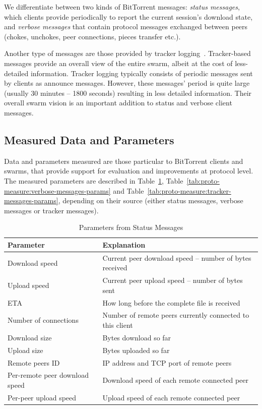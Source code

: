 We differentiate between two kinds of BitTorrent messages: \textit{status
messages}, which clients provide periodically to report the current session’s
download state, and \textit{verbose messages} that contain protocol messages
exchanged between peers (chokes, unchokes, peer connections, pieces transfer
etc.).

Another type of messages are those provided by tracker
logging~\cite{tracker-mon}. Tracker-based
messages provide an overall view of the entire swarm, albeit at the cost of
less-detailed information. Tracker logging typically consists of periodic
messages sent by clients as announce messages. However, these messages' period
is quite large (usually 30 minutes -- 1800 seconds) resulting in less detailed
information. Their overall swarm vision is an important addition to status and
verbose client messages.

\subsection{Measured Data and Parameters}

Data and parameters measured are those particular to BitTorrent clients and
swarms, that provide support for evaluation and improvements at protocol level.
The measured parameters are described in
Table~\ref{tab:proto-measure:status-messages-params},
Table~\ref{tab:proto-measure:verbose-messages-params} and
Table~\ref{tab:proto-measure:tracker-messages-params}, depending
on their source (either status messages, verbose messages or tracker
messages).

\begin{table}[htb]
  \centering
  \caption{Parameters from Status Messages}
  \label{tab:proto-measure:status-messages-params}
  \begin{tabular}{@{}ll@{}}
    \toprule
      \textbf{Parameter} & \textbf{Explanation} \\
    \midrule
      Download speed & Current peer download speed -- number of bytes
      received \\
      Upload speed & Current peer upload speed -- number of bytes sent \\
      ETA & How long before the complete file is received \\
      Number of connections & Number of remote peers currently connected to
      this client \\
      Download size & Bytes download so far \\
      Upload size & Bytes uploaded so far \\
      Remote peers ID & IP address and TCP port of remote peers \\
      Per-remote peer download speed & Download speed of each remote connected
      peer \\
      Per-peer upload speed & Upload speed of each remote connected peer \\
    \bottomrule
  \end{tabular}
\end{table}

